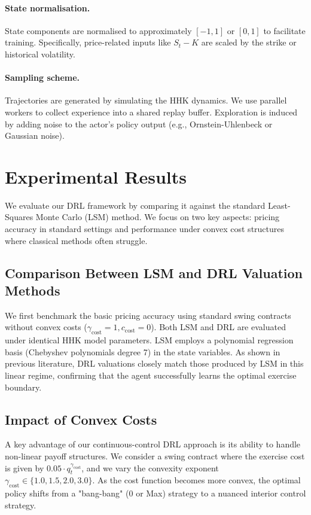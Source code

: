 \documentclass[a4paper,fleqn]{cas-dc}
\begin{document}
\paragraph{State normalisation.}
State components are normalised to approximately $[-1,1]$ or $[0,1]$ to facilitate training. Specifically, price-related inputs like $S_t-K$ are scaled by the strike or historical volatility.

\paragraph{Sampling scheme.}
Trajectories are generated by simulating the HHK dynamics. We use parallel workers to collect experience into a shared replay buffer. Exploration is induced by adding noise to the actor's policy output (e.g., Ornstein-Uhlenbeck or Gaussian noise).

\section{Experimental Results}

We evaluate our DRL framework by comparing it against the standard Least-Squares Monte Carlo (LSM) method. We focus on two key aspects: pricing accuracy in standard settings and performance under convex cost structures where classical methods often struggle.

\subsection{Comparison Between LSM and DRL Valuation Methods}

We first benchmark the basic pricing accuracy using standard swing contracts without convex costs ($\gamma_{\mathrm{cost}}=1, c_{\mathrm{cost}}=0$). Both LSM and DRL are evaluated under identical HHK model parameters. LSM employs a polynomial regression basis (Chebyshev polynomials degree 7) in the state variables.
As shown in previous literature, DRL valuations closely match those produced by LSM in this linear regime, confirming that the agent successfully learns the optimal exercise boundary.

\subsection{Impact of Convex Costs}

A key advantage of our continuous-control DRL approach is its ability to handle non-linear payoff structures. We consider a swing contract where the exercise cost is given by $0.05 \cdot q_t^{\gamma_{\mathrm{cost}}}$, and we vary the convexity exponent $\gamma_{\mathrm{cost}} \in \{1.0, 1.5, 2.0, 3.0\}$.
As the cost function becomes more convex, the optimal policy shifts from a "bang-bang" (0 or Max) strategy to a nuanced interior control strategy.
\end{document}
